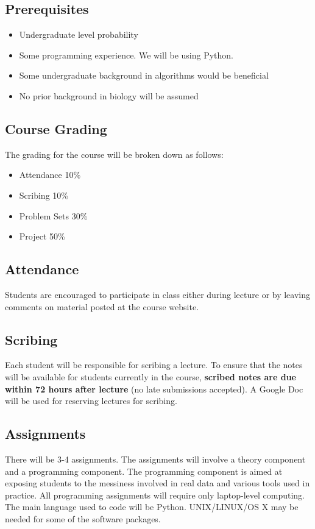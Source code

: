\documentclass[11pt,onecolumn]{article}
\begin{document}
\subsection*{Prerequisites}
\begin{itemize}
	\itemsep0em 
	\item Undergraduate level probability
	\item Some programming experience. We will be using Python.
	\item Some undergraduate background in algorithms would be beneficial
	\item No prior background in biology will be assumed
\end{itemize}

\subsection*{Course Grading}
The grading for the course will be broken down as follows:
\begin{itemize}
	\itemsep0em 
	\item Attendance 10\%
	\item Scribing 10\%
	\item Problem Sets 30\%
	\item Project 50\%
\end{itemize}

\subsection*{Attendance}
Students are encouraged to participate in class either during lecture or by leaving comments on material posted at the course website.

\subsection*{Scribing}
Each student will be responsible for scribing a lecture. To ensure that the notes will be available for students currently in the course, \textbf{scribed notes are due within 72 hours after lecture} (no late submissions accepted). A Google Doc will be used for reserving lectures for scribing.

\subsection*{Assignments}
There will be 3-4 assignments. The assignments will involve a theory component and a programming component. The programming component is aimed at exposing students to the messiness involved in real data and various tools used in practice. All programming assignments will require only laptop-level computing. The main language used to code will be Python. UNIX/LINUX/OS X may be needed for some of the software packages.
\end{document}
